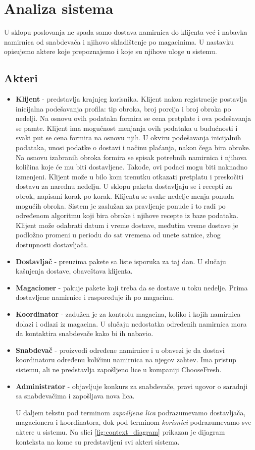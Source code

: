 
\section{Analiza sistema}

	U sklopu poslovanja ne spada samo dostava namirnica do klijenta već i nabavka namirnica od snabdevača i njihovo skladištenje po magacinima. U nastavku opisujemo aktere koje prepoznajemo i koje su njihove uloge u sistemu.

\subsection{Akteri}
	\begin{itemize}
		\item{\textbf{Klijent}} - predstavlja krajnjeg korisnika. Klijent nakon registracije postavlja inicijalna podešavanja profila: tip obroka, broj porcija i broj obroka po nedelji. Na osnovu ovih podataka formira se cena pretplate i ova podešavanja se pamte. Klijent ima mogućnost menjanja ovih podataka u budućnosti i svaki put se cena formira na osnovu njih. U okviru podešavanja inicijalnih podataka, unosi podatke o dostavi i načinu plaćanja, nakon čega bira obroke. Na osnovu izabranih obroka formira se spisak potrebnih namirnica i njihova količina koje će mu biti dostavljene. Takođe, ovi podaci mogu biti naknadno izmenjeni. Klijent može u bilo kom trenutku otkazati pretplatu i preskočiti dostavu za narednu nedelju. U sklopu paketa dostavljaju se i recepti za obrok, napisani korak po korak. Klijentu se svake nedelje menja ponuda mogućih obroka. Sistem je zaslužan za pravljenje ponude i to radi po određenom algoritmu koji bira obroke i njihove recepte iz baze podataka. Klijent može odabrati datum i vreme dostave, međutim vreme dostave je podložno promeni u periodu do sat vremena od unete satnice, zbog dostupnosti dostavljača.
		\item{\textbf{Dostavljač}} - preuzima pakete sa liste isporuka za taj dan. U slučaju kašnjenja dostave, obaveštava klijenta.
		\item{\textbf{Magacioner}} - pakuje pakete koji treba da se dostave u toku nedelje. Prima dostavljene namirnice i raspoređuje ih po magacinu.
		\item{\textbf{Koordinator}} - zadužen je za kontrolu magacina, koliko i kojih namirnica dolazi i odlazi iz magacina. U slučaju nedostatka određenih namirnica mora da kontaktira snabdevače kako bi ih nabavio.
		\item{\textbf{Snabdevač}} - proizvodi određene namirnice i u obavezi je da dostavi koordinatoru određenu količinu namirnica na njegov zahtev. Ima pristup sistemu, ali ne predstavlja zapošljeno lice u kompaniji ChooseFresh.
		\item{\textbf{Administrator}} - objavljuje konkurs za snabdevače, pravi ugovor o saradnji sa snabdevačima i zapošljava nova lica. 
		
		U daljem tekstu pod terminom \textit{zapošljena lica} podrazumevamo dostavljača, magacionera i koordinatora, dok pod terminom \textit{korisnici} podrazumevamo sve aktere u sistemu. Na slici \ref{fig:context_diagram} prikazan je dijagram konteksta na kome su predstavljeni svi akteri sistema.
		
				
	\end{itemize}
